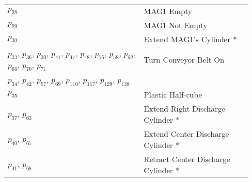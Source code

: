 \begin{longtable}{M{5cm}M{10cm}}
\hyperlink{completeNet:p28}{\hypertarget{completeTable:p28}{$p_{28}$}} & MAG1 Empty\\
\hyperlink{completeNet:p29}{\hypertarget{completeTable:p29}{$p_{29}$}} & MAG1 Not Empty\\
\hyperlink{completeNet:p30}{\hypertarget{completeTable:p30}{$p_{30}$}} & Extend MAG1's Cylinder *\\
\hyperlink{completeNet:p33}{\hypertarget{completeTable:p33}{$p_{33}$}}, \hyperlink{completeNet:p36}{\hypertarget{completeTable:p36}{$p_{36}$}}, \hyperlink{completeNet:p39}{\hypertarget{completeTable:p39}{$p_{39}$}}, \hyperlink{completeNet:p44}{\hypertarget{completeTable:p44}{$p_{44}$}}, \hyperlink{completeNet:p47}{\hypertarget{completeTable:p47}{$p_{47}$}}, \hyperlink{completeNet:p48}{\hypertarget{completeTable:p48}{$p_{48}$}}, \hyperlink{completeNet:p56}{\hypertarget{completeTable:p56}{$p_{56}$}}, \hyperlink{completeNet:p58}{\hypertarget{completeTable:p58}{$p_{58}$}}, \hyperlink{completeNet:p62}{\hypertarget{completeTable:p62}{$p_{62}$}}, \hyperlink{completeNet:p66}{\hypertarget{completeTable:p66}{$p_{66}$}}, \hyperlink{completeNet:p70}{\hypertarget{completeTable:p70}{$p_{70}$}}, \hyperlink{completeNet:p71}{\hypertarget{completeTable:p71}{$p_{71}$}} & Turn Conveyor Belt On\\
\hyperlink{completeNet:p34}{\hypertarget{completeTable:p34}{$p_{34}$}}, \hyperlink{completeNet:p42}{\hypertarget{completeTable:p42}{$p_{42}$}}, \hyperlink{completeNet:p57}{\hypertarget{completeTable:p57}{$p_{57}$}}, \hyperlink{completeNet:p69}{\hypertarget{completeTable:p69}{$p_{69}$}}, \hyperlink{completeNet:p110}{\hypertarget{completeTable:p110}{$p_{110}$}}, \hyperlink{completeNet:p117}{\hypertarget{completeTable:p117}{$p_{117}$}}, \hyperlink{completeNet:p129}{\hypertarget{completeTable:p129}{$p_{129}$}}, \hyperlink{completeNet:p138}{\hypertarget{completeTable:p138}{$p_{138}$}} & \\
\hyperlink{completeNet:p35}{\hypertarget{completeTable:p35}{$p_{35}$}} & Plastic Half-cube\\
\hyperlink{completeNet:p37}{\hypertarget{completeTable:p37}{$p_{37}$}}, \hyperlink{completeNet:p63}{\hypertarget{completeTable:p63}{$p_{63}$}} & Extend Right Discharge Cylinder *\\
\hyperlink{completeNet:p40}{\hypertarget{completeTable:p40}{$p_{40}$}}, \hyperlink{completeNet:p67}{\hypertarget{completeTable:p67}{$p_{67}$}} & Extend Center Discharge Cylinder *\\
\hyperlink{completeNet:p41}{\hypertarget{completeTable:p41}{$p_{41}$}}, \hyperlink{completeNet:p68}{\hypertarget{completeTable:p68}{$p_{68}$}} & Retract Center Discharge Cylinder *\\

\end{longtable}
